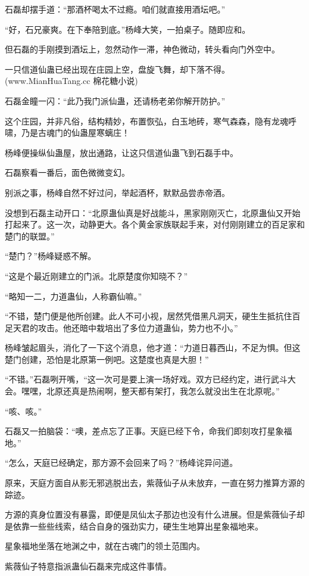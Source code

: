\begin{this_body}
石磊却摆手道：“那酒杯喝太不过瘾。咱们就直接用酒坛吧。”

“好，石兄豪爽。在下奉陪到底。”杨峰大笑，一拍桌子。随即应和。

但石磊的手刚摸到酒坛上，忽然动作一滞，神色微动，转头看向门外空中。

一只信道仙蛊已经出现在庄园上空，盘旋飞舞，却下落不得。(www.MianHuaTang.cc 棉花糖小说)

石磊金瞳一闪：“此乃我门派仙蛊，还请杨老弟你解开防护。”

这个庄园，并非凡俗，结构精妙，布置恢弘，白玉地砖，寒气森森，隐有龙魂呼啸，乃是古魂门的仙蛊屋寒螭庄！

杨峰便操纵仙蛊屋，放出通路，让这只信道仙蛊飞到石磊手中。

石磊察看一番后，面色微微变幻。

别派之事，杨峰自然不好过问，举起酒杯，默默品尝赤帝酒。

没想到石磊主动开口：“北原蛊仙真是好战能斗，黑家刚刚灭亡，北原蛊仙又开始打起来了。这一次，动静更大。各个黄金家族联起手来，对付刚刚建立的百足家和楚门的联盟。”

“楚门？”杨峰疑惑不解。

“这是个最近刚建立的门派。北原楚度你知晓不？”

“略知一二，力道蛊仙，人称霸仙嘛。”

“不错，楚门便是他所创建。此人不可小视，居然凭借黑凡洞天，硬生生抵抗住百足天君的攻击。他还暗中栽培出了多位力道蛊仙，势力也不小。”

杨峰皱起眉头，消化了一下这个消息，他才道：“力道日暮西山，不足为惧。但这楚门创建，恐怕是北原第一例吧。这楚度也真是大胆！”

“不错。”石磊咧开嘴，“这一次可是要上演一场好戏。双方已经约定，进行武斗大会。嘿嘿，北原还真是热闹啊，整天都有架打，我怎么就没出生在北原呢。”

“咳、咳。”

石磊又一拍脑袋：“噢，差点忘了正事。天庭已经下令，命我们即刻攻打星象福地。”

“怎么，天庭已经确定，那方源不会回来了吗？”杨峰诧异问道。

原来，天庭方面自从影无邪逃脱出去，紫薇仙子从未放弃，一直在努力推算方源的踪迹。

方源的真身位置没有暴露，即便是凤仙太子那边也没有什么进展。但是紫薇仙子却是依靠一些些线索，结合自身的强劲实力，硬生生地算出星象福地来。

星象福地坐落在地渊之中，就在古魂门的领土范围内。

紫薇仙子特意指派蛊仙石磊来完成这件事情。


\end{this_body}
